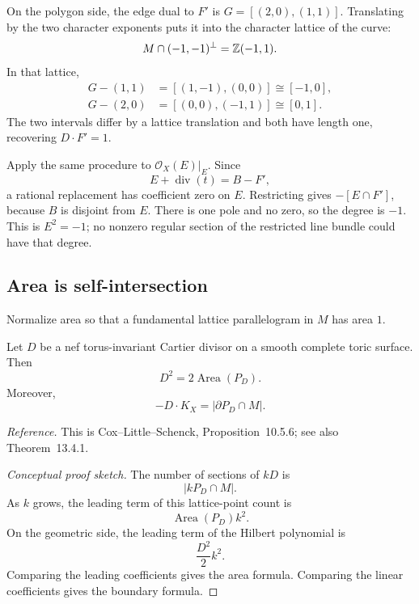 \begin{example}
On the polygon side, the edge dual to \(F'\) is
\(G=[(2,0),(1,1)]\). Translating by the two character exponents puts
it into the character lattice of the curve:
\[
M\cap(-1,-1)^\perp=\mathbb{Z}(-1,1).
\]
In that lattice,
\[
\begin{aligned}
G-(1,1)&=[(1,-1),(0,0)]\cong[-1,0],\\
G-(2,0)&=[(0,0),(-1,1)]\cong[0,1].
\end{aligned}
\]
The two intervals differ by a lattice translation and both have
length one, recovering \(D\cdot F'=1\).
\end{example}

\begin{observation}
\label{obs:classroom-oct19-negative-section}
Apply the same procedure to \(\mathcal O_X(E)|_E\). Since
\[
E+\operatorname{div}(t)=B-F',
\]
a rational replacement has coefficient zero on \(E\). Restricting
gives \(-[E\cap F']\), because \(B\) is disjoint from \(E\).
There is one pole and no zero, so the degree is \(-1\). This is
\(E^2=-1\); no nonzero regular section of the restricted line bundle
could have that degree.
\end{observation}

\subsection{Area is self-intersection}

Normalize area so that a fundamental lattice parallelogram in
\(M\) has area \(1\).

\begin{theorem}
\label{thm:polygon-area-self-intersection}
Let \(D\) be a nef torus-invariant Cartier divisor on a smooth complete
toric surface. Then
\[
\boxed{
D^2=2\operatorname{Area}(P_D).
}
\]
Moreover,
\[
-D\cdot K_X
=
|\partial P_D\cap M|.
\]
\end{theorem}

\noindent
\textit{Reference.}
This is Cox--Little--Schenck, Proposition~10.5.6; see also
Theorem~13.4.1.

\begin{proof}[Conceptual proof sketch]
The number of sections of \(kD\) is
\[
|kP_D\cap M|.
\]
As \(k\) grows, the leading term of this lattice-point count is
\[
\operatorname{Area}(P_D)k^2.
\]
On the geometric side, the leading term of the Hilbert polynomial is
\[
\frac{D^2}{2}k^2.
\]
Comparing the leading coefficients gives the area formula. Comparing
the linear coefficients gives the boundary formula.
\end{proof}

